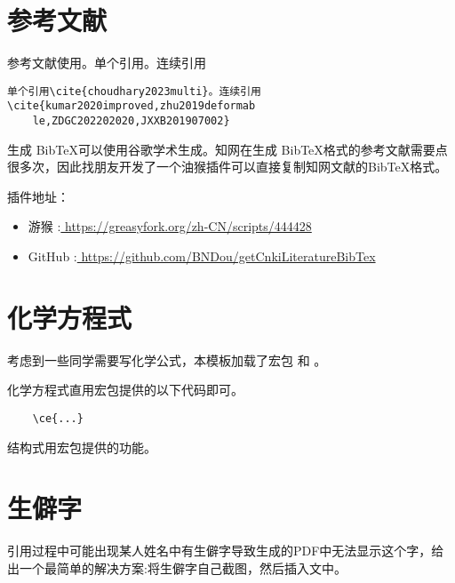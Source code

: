 \section{参考文献}
参考文献使用。单个引用\cite{choudhary2023multi}。连续引用\cite{kumar2020improved,zhu2019deformable,ZDGC202202020,JXXB201907002}
\begin{lstlisting}
单个引用\cite{choudhary2023multi}。连续引用\cite{kumar2020improved,zhu2019deformab
	le,ZDGC202202020,JXXB201907002}
\end{lstlisting}
生成 Bib\TeX 可以使用谷歌学术生成。知网在生成 Bib\TeX 格式的参考文献需要点很多次，因此找朋友开发了一个油猴插件可以直接复制知网文献的Bib\TeX 格式。

插件地址：\begin{itemize}
	\item 游猴 :\href{https://greasyfork.org/zh-CN/scripts/444428}{ \;\;https://greasyfork.org/zh-CN/scripts/444428}

	\item GitHub \faGithub :\href{https://github.com/BNDou/getCnkiLiteratureBibTex}{ \;\;https://github.com/BNDou/getCnkiLiteratureBibTex}
\end{itemize}





\section{化学方程式}
考虑到一些同学需要写化学公式，本模板加载了宏包   和 。 

化学方程式直用宏包提供的以下代码即可。
\begin{lstlisting}
	\ce{...}
\end{lstlisting} 
\begin{center}
\end{center}
结构式用宏包提供的功能。
\begin{center}
\end{center}

\section{生僻字}
引用过程中可能出现某人姓名中有生僻字导致生成的PDF中无法显示这个字，给出一个最简单的解决方案:将生僻字自己截图，然后插入文中。

